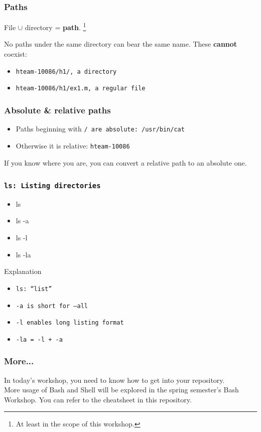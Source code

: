 \documentclass[aspectratio=169]{beamer}
\begin{document}
\begin{frame}
  \frametitle{Paths}
  File $\cup$ directory = \textbf{path}.
  \footnote{At least in the scope of this workshop.}
  \newline \newline

  No paths under the same directory can bear the same name.
  These \textbf{cannot} coexist:
  \begin{itemize}
    \item \tt{hteam-10086/h1/}, a directory
    \item \tt{hteam-10086/h1/ex1.m}, a regular file
  \end{itemize}
\end{frame}

\begin{frame}
  \frametitle{Absolute \& relative paths}
  \begin{itemize}
    \item Paths beginning with \tt{/} are absolute: \tt{/usr/bin/cat}
    \item Otherwise it is relative: \tt{hteam-10086}
  \end{itemize}

  If you know where you are, you can convert a relative path to an absolute one.
\end{frame}

\begin{frame}
  \frametitle{\tt{ls}: Listing directories}
  \begin{itemize}
    \item ls
    \item ls -a
    \item ls -l
    \item ls -la
  \end{itemize}
  \begin{block}{Explanation}
      \begin{itemize}
          \item \tt{ls}: ``list''
          \item \tt{-a} is short for \tt{--all}
          \item \tt{-l} enables long listing format
          \item \tt{-la} = \tt{-l} + \tt{-a}
      \end{itemize}
  \end{block}
\end{frame}

\begin{frame}
  \frametitle{More...}
  In today's workshop, you need to know how to get into your repository.\\
  More usage of Bash and Shell will be explored in the spring semester's Bash Workshop. You can refer to the cheatsheet in this repository.
\end{frame}
\end{document}
